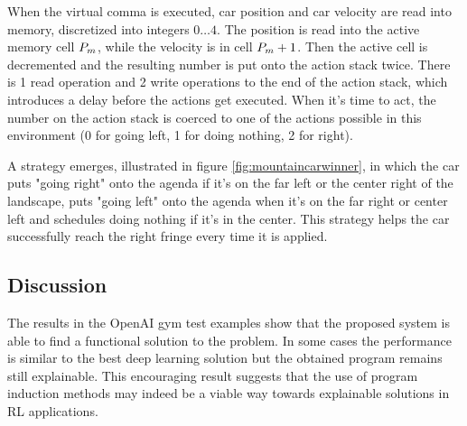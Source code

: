 When the virtual comma is executed, car position and car velocity are read into memory, discretized into integers $0\dots4$.
The position is read into the active memory cell $P_m$, while the velocity is in cell $P_m+1$.
Then the active cell is decremented and the resulting number is put onto the action stack twice.
There is 1 read operation and 2 write operations to the end of the action stack, which introduces a delay before the actions get executed.
When it's time to act, the number on the action stack is coerced to one of the actions possible in this environment (0 for going left, 1 for doing nothing, 2 for right). 

A strategy emerges, illustrated in figure \ref{fig:mountaincarwinner}, in which the car puts "going right" onto the agenda if it's on the far left or the center right of the landscape, puts "going left" onto the agenda when it's on the far right or center left and schedules doing nothing if it's in the center.
This strategy helps the car successfully reach the right fringe every time it is applied.

\subsection{Discussion}

\begin{highlight}
The results in the OpenAI gym test examples show that the proposed system is able to find a functional solution to the problem. 
In some cases the performance is similar to the best deep learning solution but the obtained program remains still explainable.
 This encouraging result suggests that the use of program induction methods may indeed be a viable way towards explainable solutions in RL applications. 
\end{highlight}

